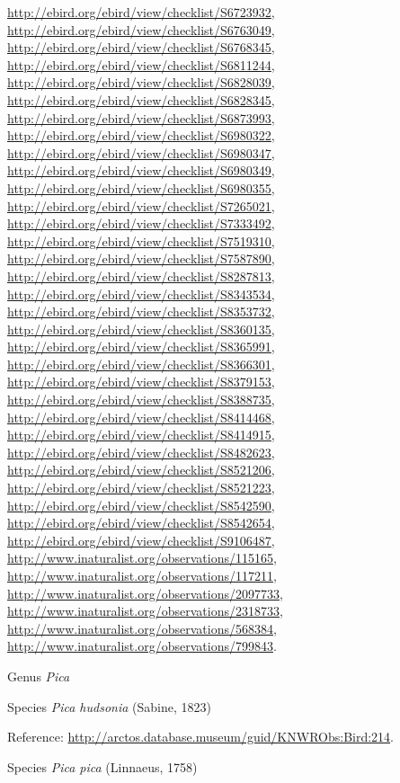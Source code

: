 \documentclass[9pt, article]{memoir}
\begin{document}
\begin{multicols}{2}
\url{http://ebird.org/ebird/view/checklist/S6723932}, 
\url{http://ebird.org/ebird/view/checklist/S6763049}, 
\url{http://ebird.org/ebird/view/checklist/S6768345}, 
\url{http://ebird.org/ebird/view/checklist/S6811244}, 
\url{http://ebird.org/ebird/view/checklist/S6828039}, 
\url{http://ebird.org/ebird/view/checklist/S6828345}, 
\url{http://ebird.org/ebird/view/checklist/S6873993}, 
\url{http://ebird.org/ebird/view/checklist/S6980322}, 
\url{http://ebird.org/ebird/view/checklist/S6980347}, 
\url{http://ebird.org/ebird/view/checklist/S6980349}, 
\url{http://ebird.org/ebird/view/checklist/S6980355}, 
\url{http://ebird.org/ebird/view/checklist/S7265021}, 
\url{http://ebird.org/ebird/view/checklist/S7333492}, 
\url{http://ebird.org/ebird/view/checklist/S7519310}, 
\url{http://ebird.org/ebird/view/checklist/S7587890}, 
\url{http://ebird.org/ebird/view/checklist/S8287813}, 
\url{http://ebird.org/ebird/view/checklist/S8343534}, 
\url{http://ebird.org/ebird/view/checklist/S8353732}, 
\url{http://ebird.org/ebird/view/checklist/S8360135}, 
\url{http://ebird.org/ebird/view/checklist/S8365991}, 
\url{http://ebird.org/ebird/view/checklist/S8366301}, 
\url{http://ebird.org/ebird/view/checklist/S8379153}, 
\url{http://ebird.org/ebird/view/checklist/S8388735}, 
\url{http://ebird.org/ebird/view/checklist/S8414468}, 
\url{http://ebird.org/ebird/view/checklist/S8414915}, 
\url{http://ebird.org/ebird/view/checklist/S8482623}, 
\url{http://ebird.org/ebird/view/checklist/S8521206}, 
\url{http://ebird.org/ebird/view/checklist/S8521223}, 
\url{http://ebird.org/ebird/view/checklist/S8542590}, 
\url{http://ebird.org/ebird/view/checklist/S8542654}, 
\url{http://ebird.org/ebird/view/checklist/S9106487}, 
\url{http://www.inaturalist.org/observations/115165}, 
\url{http://www.inaturalist.org/observations/117211}, 
\url{http://www.inaturalist.org/observations/2097733}, 
\url{http://www.inaturalist.org/observations/2318733}, 
\url{http://www.inaturalist.org/observations/568384}, 
\url{http://www.inaturalist.org/observations/799843}.

\vspace{6pt}\noindent\hspace{30pt}Genus \textit{Pica}


\vspace{6pt}\noindent\hspace{36pt}Species \textit{Pica hudsonia} (Sabine, 1823)


Reference: 
\url{http://arctos.database.museum/guid/KNWRObs:Bird:214}.

\vspace{6pt}\noindent\hspace{36pt}Species \textit{Pica pica} (Linnaeus, 1758)



\end{multicols}
\end{document}
